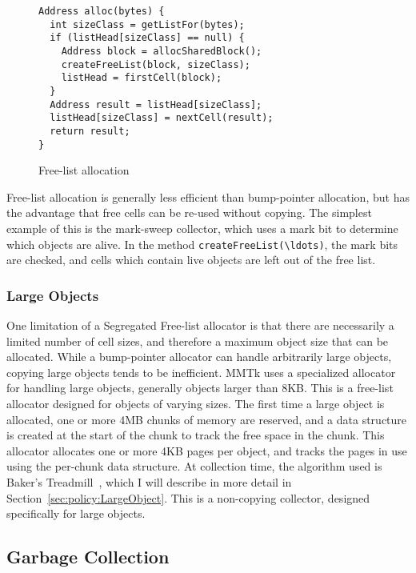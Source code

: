 \begin{figure}[h!]
\begin{lstlisting}
Address alloc(bytes) {
  int sizeClass = getListFor(bytes);
  if (listHead[sizeClass] == null) {
    Address block = allocSharedBlock();
    createFreeList(block, sizeClass);
    listHead = firstCell(block);
  }
  Address result = listHead[sizeClass];
  listHead[sizeClass] = nextCell(result);
  return result;
}
\end{lstlisting}
\caption{Free-list allocation}
\label{fig:intro:free-list}
\end{figure}

Free-list allocation is generally less efficient than bump-pointer allocation, but has the advantage
that free cells can be re-used without copying.  The simplest example of this is the mark-sweep 
collector, which uses a mark bit to determine which objects are alive.  In the method 
\lstinline|createFreeList(\ldots)|, the mark bits are checked, and cells which contain live
objects are left out of the free list.

\subsubsection{Large Objects}

One limitation of a Segregated Free-list allocator is that there are necessarily a limited number of 
cell sizes, and therefore a maximum object size that can be allocated.  While a bump-pointer allocator
can handle arbitrarily large objects, copying large objects tends to be inefficient.  MMTk uses
a specialized allocator for handling large objects, generally objects larger than 8KB.  This
is a free-list allocator designed for objects of varying sizes.
The first time a large object is allocated, one or more 4MB chunks of memory are reserved,
and a data structure is created at the start of the chunk to track the free space in the chunk.
This allocator allocates one or more 4KB pages per object, and tracks the pages in use using the
per-chunk data structure.
At collection time, the algorithm used is Baker's Treadmill~\cite{Baker:92}, which I will describe
in more detail in Section~\ref{sec:policy:LargeObject}.  This is a non-copying collector, designed
specifically for large objects.

\subsection{Garbage Collection}

